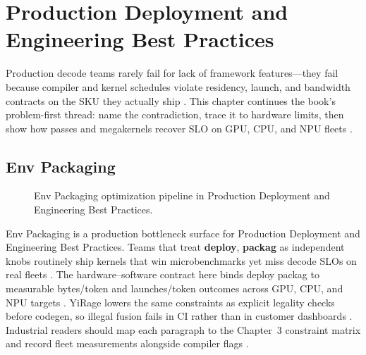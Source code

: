 \chapter{Production Deployment and Engineering Best Practices}
\label{chap:ch26}

Production decode teams rarely fail for lack of framework features---they fail because compiler and kernel schedules violate residency, launch, and bandwidth contracts on the SKU they actually ship \citep{patel2025llminference,nvidia2022hopper}. This chapter continues the book's problem-first thread: name the contradiction, trace it to hardware limits, then show how passes and megakernels recover SLO on GPU, CPU, and NPU fleets \citep{taxbreak2026,semianalysis2024tma}.

\section{Env Packaging}
\label{sec:env_packaging}
\begin{figure}[t]
\centering
{}
\caption{Env Packaging optimization pipeline in Production Deployment and Engineering Best Practices.}
\label{fig:env_packaging_pipeline}
\end{figure}


Env Packaging is a production bottleneck surface for Production Deployment and Engineering Best Practices. Teams that treat \textbf{deploy}, \textbf{packag} as independent knobs routinely ship kernels that win microbenchmarks yet miss decode SLOs on real fleets \citep{patel2025llminference,nvidia2022hopper}. The hardware--software contract here binds deploy packag to measurable bytes/token and launches/token outcomes across GPU, CPU, and NPU targets \citep{taxbreak2026,semianalysis2024tma}. YiRage lowers the same constraints as explicit legality checks before codegen, so illegal fusion fails in CI rather than in customer dashboards \citep{memoryfloor2026,amd2024xdna}. Industrial readers should map each paragraph to the Chapter~3 constraint matrix and record fleet measurements alongside compiler flags \citep{nvidia2022hopper,amd2024aie}.

